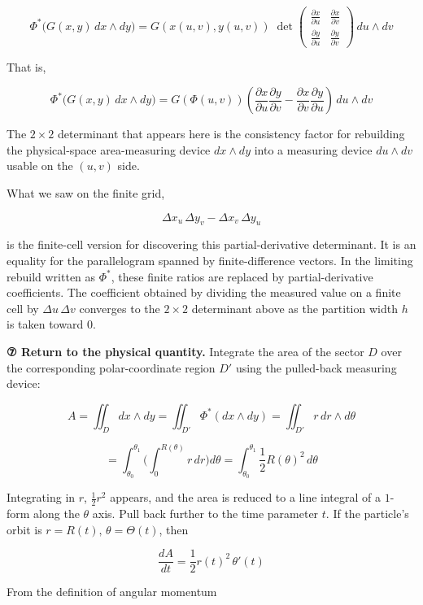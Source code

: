 \[\Phi^*\bigl(G(x,y)\,dx \wedge dy\bigr) = G(x(u,v), y(u,v))\;
\det\!\begin{pmatrix}
\frac{\partial x}{\partial u} & \frac{\partial x}{\partial v} \\[6pt]
\frac{\partial y}{\partial u} & \frac{\partial y}{\partial v}
\end{pmatrix}
\,du \wedge dv\]

That is,

\[\Phi^*\bigl(G(x,y)\,dx \wedge dy\bigr)
=G(\Phi(u,v))\left(
\frac{\partial x}{\partial u}\frac{\partial y}{\partial v}
-\frac{\partial x}{\partial v}\frac{\partial y}{\partial u}
\right)\,du\wedge dv\]

The \(2\times2\) determinant that appears here is the consistency factor
for rebuilding the physical-space area-measuring device \(dx\wedge dy\)
into a measuring device \(du\wedge dv\) usable on the \((u,v)\) side.

What we saw on the finite grid,

\[\Delta x_u\,\Delta y_v-\Delta x_v\,\Delta y_u\]

is the finite-cell version for discovering this partial-derivative
determinant. It is an equality for the parallelogram spanned by
finite-difference vectors. In the limiting rebuild written as
\(\Phi^*\), these finite ratios are replaced by partial-derivative
coefficients. The coefficient obtained by dividing the measured value on
a finite cell by \(\Delta u\,\Delta v\) converges to the \(2\times2\)
determinant above as the partition width \(h\) is taken toward \(0\).

\textbf{⑦ Return to the physical quantity.} Integrate the area of the
sector \(D\) over the corresponding polar-coordinate region \(D'\) using
the pulled-back measuring device:

\[
A
=
\iint_D dx\wedge dy
=
\iint_{D'} \Phi^*(dx\wedge dy)
=
\iint_{D'} r\,dr\wedge d\theta
\]

\[
=
\int_{\theta_0}^{\theta_1}
\biggl(
  \int_0^{R(\theta)} r\,dr
\biggr)
d\theta
=
\int_{\theta_0}^{\theta_1}
\frac{1}{2}R(\theta)^2\,d\theta
\]

Integrating in \(r\), \(\frac{1}{2}r^2\) appears, and the area is
reduced to a line integral of a \(1\)-form along the \(\theta\) axis.
Pull back further to the time parameter \(t\). If the particle's orbit
is \(r = R(t),\, \theta = \Theta(t)\), then

\[
\frac{dA}{dt}
=
\frac{1}{2}r(t)^2\,\theta'(t)
\]

From the definition of angular momentum

